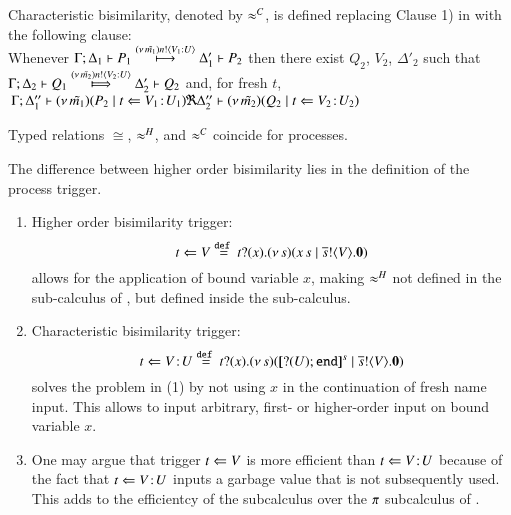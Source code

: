 {\begin{definition}%
	\label{d:fwb}
	Characteristic bisimilarity, denoted by $\approx^C$, is defined  replacing 
	Clause 1) in  with the following clause:\\[1mm]
	Whenever 
	$\Gamma; \Delta_1 \vdash P_1 \stackrel{(\nu\, \tilde{m_1}) n ! \langle V_1: U \rangle}{\longmapsto} \Delta_1' \vdash P_2$ %
	then there exist 
	$Q_2$, $V_2$, $\Delta'_2$ such that \\
	$\horel{\Gamma}{\Delta_2}{Q_1}{\Hby{\news{\tilde{m_2}}\bactout{n}{V_2: U}}}{\Delta_2'}{Q_2}$ %
	and, for fresh $t$, \\[1mm]
	$\begin{array}{lrlll}
	\!\!\Gamma; \Delta''_1  \proves  {\newsp{\tilde{m_1}}{P_2 \Par 
	\ftrigger{t}{V_1}{U_1}}}
	\ \!\!\Re\!\!
	\ \Delta''_2 \proves {\newsp{\tilde{m_2}}{Q_2 \Par \ftrigger{t}{V_2}{U_2}}}
\end{array}
$
\end{definition}

\begin{theorem}
	Typed relations $\cong$, $\approx^H$, and $\approx^C$ coincide for \HOp processes.
\end{theorem}


\begin{remark}
	The difference between higher order bisimilarity
	lies in the definition of the process trigger.
	\begin{enumerate}
		\item
				Higher order bisimilarity trigger:
				\[
					t \Leftarrow V  \stackrel{\mathtt{def}\ }{=}  t ? (x) . (\nu\, s)(x\, {s} \;|\; \overline{s} ! \langle V \rangle . \mathbf{0})
				\]
				allows for the application of bound variable $x$,
				making $\approx^H$ not defined in the \sessp sub-calculus
				of \HOp, but defined inside the \HO sub-calculus. 

		\item	Characteristic bisimilarity trigger:
				\[
					t \Leftarrow V \! : \! U \stackrel{\mathtt{def}\ }{=}  t ? (x) . (\nu\, s)([\!\![? (U) ; \mathtt{end}]\!\!]^{s} \;|\; \overline{s} ! \langle V \rangle . \mathbf{0})
				\]
				solves the problem in (1) by not using $x$ in the continuation
				of fresh name input. This allows to input arbitrary, first- or
				higher-order input on bound variable $x$.

		\item	One may argue that trigger $t \Leftarrow V$ is
				more efficient than $t \Leftarrow V \! : \! U$ because
				of the fact that $t \Leftarrow V \! : \! U$ inputs a garbage
				value that is not subsequently used.
				This adds to the efficientcy of the \HO subcalculus
				over the $\pi$ subcalculus of \HOp.
	\end{enumerate}
\end{remark}

}
